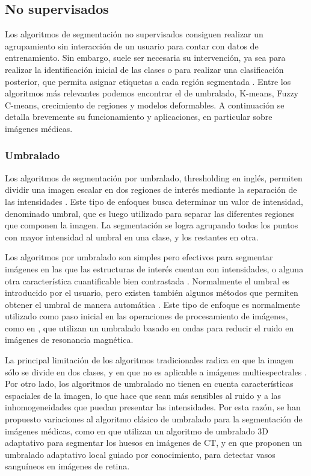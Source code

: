 \subsection{No supervisados}
Los algoritmos de segmentación no supervisados consiguen realizar un agrupamiento sin interacción de un usuario para contar con datos de entrenamiento. Sin embargo, suele ser necesaria su intervención, ya sea para realizar la identificación inicial de las clases o para realizar una clasificación posterior, que permita asignar etiquetas a cada región segmentada \citep{clarke1995mri}.
Entre los algoritmos más relevantes podemos encontrar el de umbralado, K-means, Fuzzy C-means, crecimiento de regiones y modelos deformables. A continuación se detalla brevemente su funcionamiento y aplicaciones, en particular sobre imágenes médicas.

\subsubsection{Umbralado}
Los algoritmos de segmentación por umbralado,  thresholding en inglés, permiten dividir una imagen escalar en dos regiones de interés mediante la separación de las intensidades \citep{weszka1978survey}. Este tipo de enfoques busca determinar un valor de intensidad, denominado umbral, que es luego utilizado para separar las diferentes regiones que componen la imagen. La segmentación se logra agrupando todos los puntos con mayor intensidad al umbral en una clase, y los restantes en otra.

Los algoritmos por umbralado son simples pero efectivos para segmentar imágenes en las que las estructuras de interés cuentan con intensidades, o alguna otra característica cuantificable bien contrastada \citep{pham2000current}. Normalmente el umbral es introducido por el usuario, pero existen también algunos métodos que permiten obtener el umbral de manera automática \citep{sahoo1988survey}. Este tipo de enfoque es normalmente utilizado como paso inicial en las operaciones de procesamiento de imágenes, como en \citep{bao2003noise}, que utilizan un umbralado basado en ondas para reducir el ruido en imágenes de resonancia magnética.

La  principal limitación de los algoritmos tradicionales radica en que la imagen sólo se divide en dos clases, y en que no es aplicable a imágenes multiespectrales \citep{pham2000current}. Por otro lado, los algoritmos de umbralado no tienen en cuenta características espaciales de la imagen, lo que hace que sean más sensibles al ruido y a las inhomogeneidades que puedan presentar las intensidades. Por esta razón, se han propuesto variaciones al algoritmo clásico de umbralado para la segmentación de imágenes médicas, como en \citep{zhang2010fast} que utilizan un algoritmo de umbralado 3D adaptativo para segmentar los huesos en imágenes de CT, y en \citep{jiang2003adaptive} que proponen un umbralado adaptativo local guiado por conocimiento, para detectar vasos sanguíneos en imágenes de retina.

